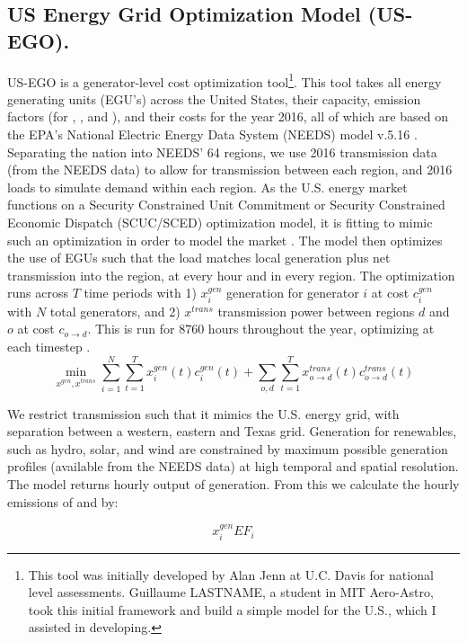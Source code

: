 \documentclass[12]{article}
\begin{document}
\subsection{US Energy Grid Optimization Model (US-EGO).}
US-EGO is a generator-level cost optimization tool\footnote{This tool was initially developed by Alan Jenn at U.C. Davis for national level assessments. Guillaume LASTNAME, a student in MIT Aero-Astro, took this initial framework and build a simple model for the U.S., which I assisted in developing.}. This tool takes all energy generating units (EGU's) across the United States, their capacity, emission factors (for , , and ), and their costs for the year 2016, all of which are based on the EPA's National Electric Energy Data System (NEEDS) model v.5.16 \citep{epa_power_2016}. Separating the nation into NEEDS' 64 regions, we use 2016 transmission data (from the NEEDS data) to allow for transmission between each region, and 2016 loads to simulate demand within each region. As the U.S. energy market functions on a Security Constrained Unit Commitment or Security Constrained Economic Dispatch (SCUC/SCED) optimization model, it is fitting to mimic such an optimization in order to model the market \citep{ela_evolution_2014}. The model then optimizes the use of EGUs such that the load matches local generation plus net transmission into the region, at every hour and in every region. The optimization runs across $T$ time periods with 1) $x^{gen}_{i}$ generation for generator $i$ at cost $c^{gen}_{i}$ with $N$ total generators, and 2) $x^{trans}$ transmission power between regions $d$ and $o$ at cost $c_{o\rightarrow{}d}$. This is run for 8760 hours throughout the year, optimizing at each timestep \citep{jenn_future_2018}.
\begin{equation}
    \min\limits_{x^{gen}, x^{trans}}\sum_{i=1}^{N}\sum_{t=1}^{T} x^{gen}_{i}(t) c^{gen}_{i}(t) + \sum_{o,d}\sum_{t=1}^{T} x^{trans}_{o\rightarrow{}d}(t) c^{trans}_{o\rightarrow{}d}(t)
\end{equation}

We restrict transmission such that it mimics the U.S. energy grid, with separation between a western, eastern and Texas grid. Generation for renewables, such as hydro, solar, and wind are constrained by maximum possible generation profiles (available from the NEEDS data) at high temporal and spatial resolution. 
The model returns hourly output of generation. From this we calculate the hourly emissions of  and  by:

\begin{equation}
    x^{gen}_{i}EF_i
\end{equation}
\end{document}
